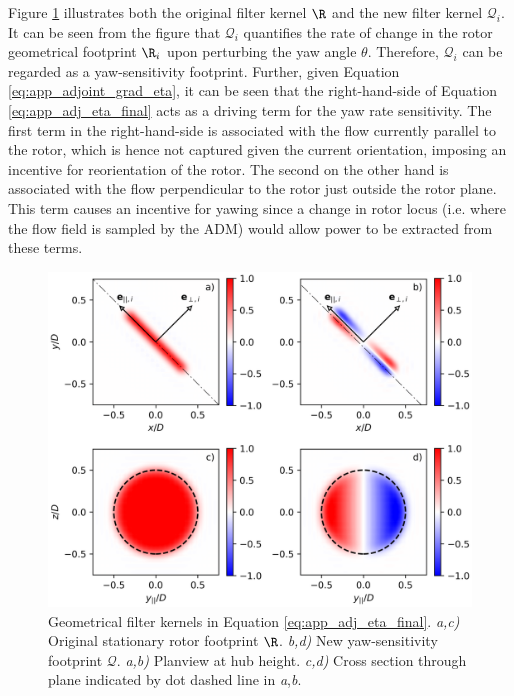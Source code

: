 Figure \ref{fig:filters} illustrates both the original filter kernel $\R$ and the new filter kernel $\mathscr{Q}_i$. It can be seen from the figure that $\mathscr{Q}_i$ quantifies the rate of change in the rotor geometrical footprint $\R_i$ upon perturbing the yaw angle $\theta$. Therefore, $\mathscr{Q}_i$ can be regarded as a yaw-sensitivity footprint.
Further, given Equation \eqref{eq:app_adjoint_grad_eta}, it can be seen that the right-hand-side of Equation \eqref{eq:app_adj_eta_final} acts as a driving term for the yaw rate sensitivity. The first term in the right-hand-side is associated with the flow currently parallel to the rotor, which is hence not captured given the current orientation, imposing an incentive for reorientation of the rotor. The second on the other hand is associated with the flow perpendicular to the rotor just outside the rotor plane. This term causes an incentive for yawing since a change in rotor locus (i.e. where the flow field is sampled by the ADM) would allow power to be extracted from these terms. 

\begin{figure}
	\includegraphics[width=\textwidth]{chapters/appendix_adjoint_derivation/R_Qpng.eps}
	\caption{Geometrical filter kernels in Equation \eqref{eq:app_adj_eta_final}. \emph{a,c)} Original stationary rotor footprint $\R$. \emph{b,d)} New yaw-sensitivity footprint $\mathscr{Q}$. \emph{a,b)} Planview at hub height. \emph{c,d)} Cross section through plane indicated by dot dashed line in \emph{a},\emph{b}. \label{fig:filters}}
\end{figure}

\cleardoublepage